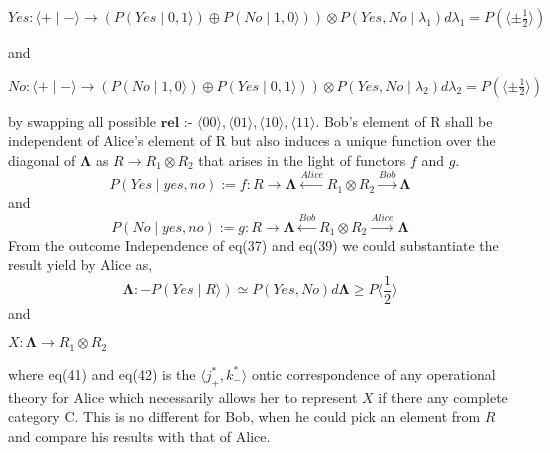 \documentclass{article}
\begin{document}
\begin{center}
$Yes:  \langle + \mid - \rangle \longrightarrow (P(Yes \mid 0, 1 \rangle) \oplus P (No \mid 1, 0\rangle)) \otimes P(Yes,No \mid \lambda_1) d\lambda_1 = P(\langle \pm \frac{1}{2} \rangle )$ 
\end{center} and
\begin{center}
$No:  \langle + \mid - \rangle \longrightarrow (P(No \mid 1, 0 \rangle)  \oplus P (Yes \mid 0, 1\rangle)) \otimes P(Yes, No \mid \lambda_2) d\lambda_2 = P(\langle \pm \frac{1}{2} \rangle )$ 
\end{center} 
by swapping all possible $\boldsymbol{rel}$ :- $\langle 00 \rangle , \langle 01 \rangle, \langle 10 \rangle, \langle 11 \rangle$. 
Bob's element of R shall be independent of Alice's element of R but also induces a unique function over the diagonal of $\boldsymbol{\Lambda}$ as $R \longrightarrow R_1 \otimes R_2$ that arises in  the light of functors $f$ and $g$.
\begin{equation}
P( Yes \mid yes, no ) := f: R \longrightarrow  \boldsymbol{\Lambda} \xleftarrow{Alice} R_1 \otimes R_2 \xrightarrow{Bob} \boldsymbol{\Lambda}
\end{equation}
 and
\begin{equation}
P( No \mid yes, no ) := g: R \longrightarrow  \boldsymbol{\Lambda} \xleftarrow{Bob} R_1 \otimes R_2 \xrightarrow{Alice} \boldsymbol{\Lambda}
\end{equation} From the outcome Independence of eq(37) and eq(39) we could substantiate the result yield by Alice as,
\begin{equation}
\boldsymbol{\Lambda}:-   P(Yes \mid R \rangle )  \simeq P(Yes, No) d\boldsymbol{\Lambda} \geq P\langle \frac{1}{2}\rangle
\end{equation} and 
\begin{center}
  $X: \boldsymbol{\Lambda} \longrightarrow R_1 \otimes R_2$
\end{center} where eq(41) and eq(42) is the $\langle j^{*}_+, k^{*}_ - \rangle$ ontic correspondence of any operational theory for Alice which necessarily allows her to represent $X$ if there any complete category C. This is no different for Bob, when he could pick an element from $R$ and compare his results with that of Alice.  
\end{document}
